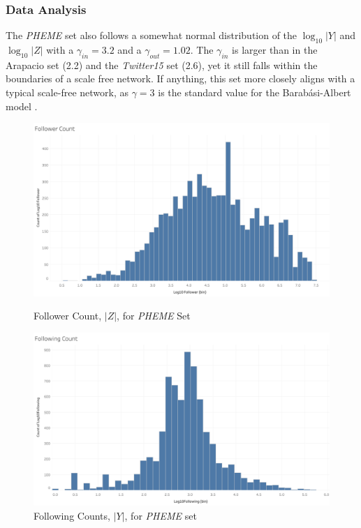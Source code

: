 \documentclass[preprint,review,12pt]{elsarticle}
\begin{document}
\subsubsection{Data Analysis}
The \textit{PHEME} set also follows a somewhat normal distribution of the $\log_{10}|Y|$ and $\log_{10}|Z|$ with a $\gamma_{in} = 3.2$ and a $\gamma_{out} = 1.02$. The $\gamma_{in}$ is larger than in the Arapacio set (2.2) and the \textit{Twitter15} set (2.6), yet it still falls within the boundaries of a scale free network. If anything, this set more closely aligns with a typical scale-free network, as $\gamma = 3$ is the standard value for the Barab{\'a}si-Albert model \cite{barabasi1999emergence,barabasi2000scale,pastor2001epidemic}.
 \begin{figure}[h]
  \includegraphics[width=\linewidth]{FollowerCountPheme.png}
  \caption{Follower Count, $|Z|$, for \textit{PHEME} Set}\label{fig:Pheme Follower}
\endminipage\hfill
{}
  \includegraphics[width=\linewidth]{FollowingCountPheme.png}
  \caption{Following Counts, $|Y|$, for \textit{PHEME} set}\label{fig:Pheme Following}
\endminipage\hfill
\end{figure}
\end{document}
